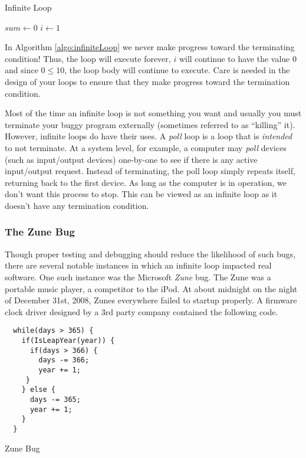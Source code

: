 \begin{algorithm}[h]
\caption{Infinite Loop}
\label{algo:infiniteLoop}
$sum \leftarrow 0$ \;
$i \leftarrow 1$ \;
\end{algorithm}

In Algorithm \ref{algo:infiniteLoop} we never make progress toward the terminating
condition!  Thus, the loop will execute forever, $i$ will continue to have the value 0
and since $0 \leq 10$, the loop body will continue to execute.  Care is needed in the
design of your loops to ensure that they make progress toward the termination condition.

Most of the time an infinite loop is not something you want and usually you must 
terminate your buggy program externally (sometimes referred to as ``killing'' it).  
However, infinite loops do have their uses.  A \emph{poll} loop is a loop that is
\emph{intended} to not terminate.  At a system level, for example, a computer
may \emph{poll} devices (such as input/output devices) one-by-one to see if
there is any active input/output request.  Instead of terminating, the poll loop
simply repeats itself, returning back to the first device.  As long as the computer
is in operation, we don't want this process to stop.  This can be viewed as an 
infinite loop as it doesn't have any termination condition.

\subsubsection{The Zune Bug}
\label{subsubsection:zuneBug}

Though proper testing and debugging should reduce the likelihood of such bugs,
there are several notable instances in which an infinite loop impacted real 
software.  One such instance was the Microsoft \emph{Zune} bug.  The Zune
was a portable music player, a competitor to the iPod.  At about midnight on 
the night of December 31st, 2008, Zunes everywhere failed to startup properly.
A firmware clock driver designed by a 3rd party company contained the following
code. 

\begin{listing}[H]
\begin{verbatim}
  while(days > 365) {
    if(IsLeapYear(year)) {
      if(days > 366) {
        days -= 366;
        year += 1;
     }
    } else {
      days -= 365;
      year += 1;
    }
  }
\end{verbatim}
  \caption{Zune Bug}
  \label{code:c:zuneBug}
\end{listing}

